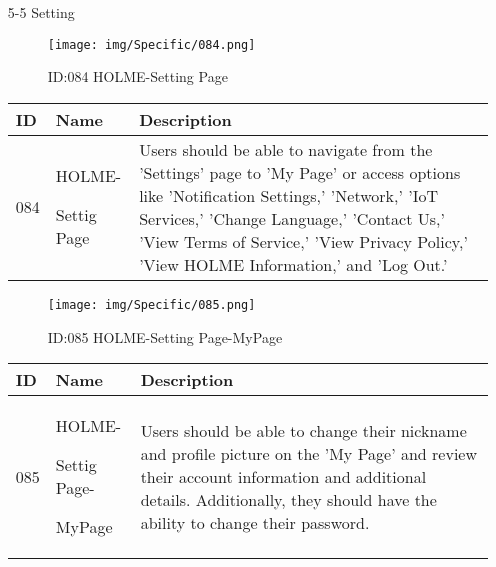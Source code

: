 \documentclass[conference]{IEEEtran}
\begin{document}
\begin{enumerate}
\item[5-5] Setting \\
\begin{figure}[h]
\centering                                         
\texttt{[image: img/Specific/084.png]}
\caption{ID:084 HOLME-Setting Page}
\end{figure}
\begin{table}[h]
\def\arraystretch{1.2} \small
    \begin{tabular}{|p{1cm}|p{1.8cm}|p{5.0cm}|}
        \hline
        ID & Name & Description\\ \hline
         084 \par  & HOLME-\par Settig Page & 
         Users should be able to navigate from the 'Settings' page to 'My Page' or access options like 'Notification Settings,' 'Network,' 'IoT Services,' 'Change Language,' 'Contact Us,' 'View Terms of Service,' 'View Privacy Policy,' 'View HOLME Information,' and 'Log Out.'
         \\ \hline
    \end{tabular}
\end{table}
\begin{figure}[h]
\centering                                         
\texttt{[image: img/Specific/085.png]}
\caption{ID:085 HOLME-Setting Page-MyPage}
\end{figure}
\begin{table}[h]
\def\arraystretch{1.2} \small
    \begin{tabular}{|p{1cm}|p{1.8cm}|p{5.0cm}|}
        \hline
        ID & Name & Description\\ \hline
         085 \par  & HOLME-\par Settig Page- \par MyPage & 
        Users should be able to change their nickname and profile picture on the 'My Page' and review their account information and additional details. Additionally, they should have the ability to change their password.
         \\ \hline
    \end{tabular}
\end{table}
\clearpage


\end{enumerate}
\end{document}
